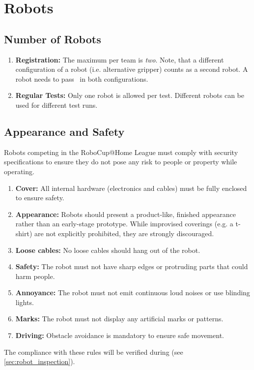 \section{Robots}\label{rule:robots}

\subsection{Number of Robots}\label{rule:robots_number}

\begin{enumerate}
	\item \textbf{Registration:} The maximum  per team is \emph{two}. Note, that a different configuration of a robot (i.e. alternative gripper) counts as a second robot. A robot needs to pass \RobotInspection \ in both configurations.
	\item \textbf{Regular Tests:} Only one robot is allowed per test. Different robots can be used for different test runs.
\end{enumerate}

\subsection{Appearance and Safety}\label{rule:robot_appearance}

Robots competing in the RoboCup@Home League must comply with security specifications to ensure they do not pose any risk to people or property while operating.
\begin{enumerate}
	\item \textbf{Cover:} All internal hardware (electronics and cables) must be fully enclosed to ensure safety.
	\item \textbf{Appearance:} Robots should present a product-like, finished appearance rather than an early-stage prototype. While improvised coverings (e.g. a t-shirt) are not explicitly prohibited, they are strongly discouraged. %
	\item \textbf{Loose cables:} No loose cables should hang out of the robot.
	\item \textbf{Safety:} The robot must not have sharp edges or protruding parts that could harm people.
	\item \textbf{Annoyance:} The robot must not emit continuous loud noises or use blinding lights.
	\item \textbf{Marks:} The robot must not display any artificial marks or patterns.
	\item \textbf{Driving:} Obstacle avoidance is mandatory to ensure safe movement.
\end{enumerate}
The compliance with these rules will be verified during \RobotInspection{} (see \ref{sec:robot_inspection}).

